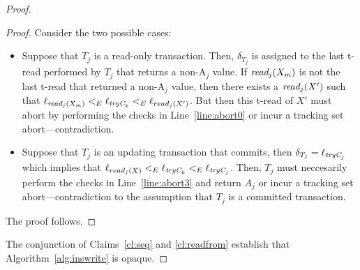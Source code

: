 \begin{proof}
\begin{proof}
Consider the two possible cases:
%
\begin{itemize}
\item
Suppose that $T_j$ is a read-only transaction. 
Then, $\delta_{T_j}$ is assigned to the last t-read performed by $T_j$ that returns a non-A$_j$ value. 
If $\textit{read}_j(X_m)$ is not the last t-read that returned a non-A$_j$ value, then there exists a $\textit{read}_j(X')$ such that 
$\ell_{\textit{read}_j(X_m)} <_{E} \ell_{\textit{tryC}_k} <_E \ell_{read_j(X')}$.
But then this t-read of $X'$ must abort by performing the checks in Line~\ref{line:abort0} or incur a tracking set abort---contradiction.
\item
Suppose that $T_j$ is an updating transaction that commits, then $\delta_{T_j}=\ell_{\textit{tryC}_j}$ which implies that
$\ell_{read_j(X)} <_{E} \ell_{\textit{tryC}_k} <_E \ell_{\textit{tryC}_j}$. Then, $T_j$ must neccesarily perform the checks
in Line~\ref{line:abort3} and return $A_j$ or incur a tracking set abort---contradiction to the assumption that $T_j$ is a committed transaction.
\end{itemize}
%
The proof follows.
%
\end{proof}
%
The conjunction of Claims~\ref{cl:seq} and \ref{cl:readfrom} establish that Algorithm~\ref{alg:inswrite} is opaque.
%
\end{proof}
%
